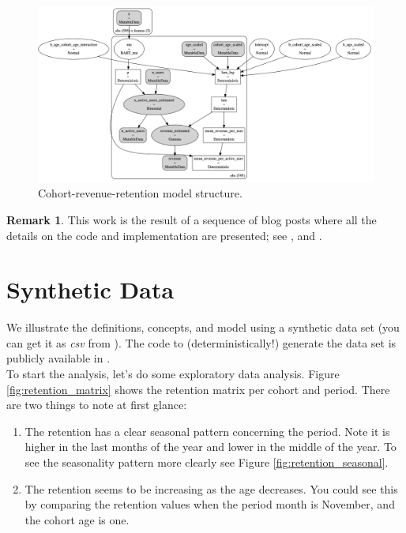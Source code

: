 \documentclass[11pt]{amsart}
\theoremstyle{definition}
\newtheorem{remark}{Remark}
\begin{document}
\begin{figure}
    \centering
    \includegraphics[width=\textwidth]{images/revenue_retention_33_0.png}
    \caption{Cohort-revenue-retention model structure.}
    \label{fig:revenue_retention_model}
\end{figure}


\begin{remark}
This work is the result of a sequence of blog posts where all the details on the code
and implementation are presented; see \cite{orduz_retention},
\cite{orduz_retention_bart} and \cite{orduz_revenue_retention}.  
\end{remark}


\section{Synthetic Data}

We illustrate the definitions, concepts, and model using a synthetic data set (you can
get it as {\em csv} from \cite{orduz_revenue_retention_data}). The code to
(deterministically!) generate the data set is publicly available in 
\cite{orduz_revenue_retention_data_code}. \\

To start the analysis, let's do some exploratory data analysis. Figure
\ref{fig:retention_matrix} shows the retention matrix per cohort and period. There are 
two things to note at first glance:

\begin{enumerate}
    \item The retention has a clear seasonal pattern concerning the period. Note it is 
        higher in the last months of the year and lower in the middle of the year. To 
        see the seasonality pattern more clearly see Figure 
        \ref{fig:retention_seasonal}.
    \item The retention seems to be increasing as the age decreases. You could see this
    by comparing the retention values when the period month is November, and the cohort
    age is one.
\end{enumerate}
\end{document}
